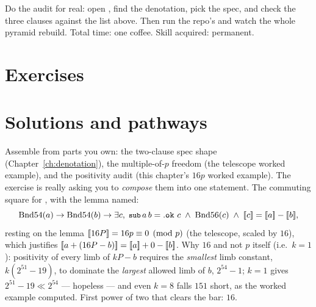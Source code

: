 \begin{tryit}
Do the audit for real: open , find the
denotation, pick the  spec, and check the three clauses against
the list above. Then run the repo's  and watch the whole
pyramid rebuild. Total time: one coffee. Skill acquired: permanent.
\end{tryit}

\section*{Exercises}




\section*{Solutions and pathways}
\solutionsintro

\pathway Assemble from parts you own: the two-clause spec shape
(Chapter~\ref{ch:denotation}), the multiple-of-$p$ freedom (the telescope
worked example), and the positivity audit (this chapter's $16p$ worked
example). The exercise is really asking you to \emph{compose} them into
one statement.
\answer The commuting square for , with the lemma named:
\[
\mathrm{Bnd54}(a) \to \mathrm{Bnd54}(b) \to
\exists c,\; \code{sub}\,a\,b = \mathtt{.ok}\ c \;\wedge\;
\mathrm{Bnd56}(c) \;\wedge\; \denote{c} = \denote{a} - \denote{b},
\]
resting on the lemma $[\mkern-3.3mu[ 16P ]\mkern-3.3mu] = 16p \equiv 0 \pmod p$ (the
telescope, scaled by $16$), which justifies
$[\mkern-3.3mu[ a + (16P - b) ]\mkern-3.3mu] = [\mkern-3.3mu[ a ]\mkern-3.3mu] + 0 - [\mkern-3.3mu[ b ]\mkern-3.3mu]$. Why $16$ and not
$p$ itself (i.e.\ $k = 1$): positivity of every limb of $kP - b$ requires
the \emph{smallest} limb constant, $k(2^{51}-19)$, to dominate the
\emph{largest} allowed limb of $b$, $2^{54}-1$; $k = 1$ gives
$2^{51}-19 \ll 2^{54}$ --- hopeless --- and even $k = 8$ falls $151$
short, as the worked example computed. First power of two that clears
the bar: $16$.

